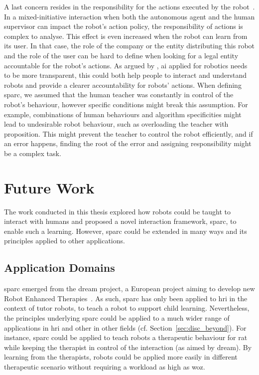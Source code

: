 A last concern resides in the responsibility for the actions executed by the robot~\citep{asaro2007robots}. In a mixed-initiative interaction when both the autonomous agent and the human supervisor can impact the robot's action policy, the responsibility of actions is complex to analyse. This effect is even increased when the robot can learn from its user. In that case, the role of the company or the entity distributing this robot and the role of the user can be hard to define when looking for a legal entity accountable for the robot's actions. As argued by \cite{wachter2017transparent}, \gls{ai} applied for robotics needs to be more transparent, this could both help people to interact and understand robots and provide a clearer accountability for robots' actions. When defining \gls{sparc}, we assumed that the human teacher was constantly in control of the robot's behaviour, however specific conditions might break this assumption. For example, combinations of human behaviours and algorithm specificities might lead to undesirable robot behaviour, such as overloading the teacher with proposition. This might prevent the teacher to control the robot efficiently, and if an error happens, finding the root of the error and assigning responsibility might be a complex task.

\section{Future Work}


The work conducted in this thesis explored how robots could be taught to interact with humans and proposed a novel interaction framework, \gls{sparc}, to enable such a learning. However, \gls{sparc} could be extended in many ways and its principles applied to other applications.

\subsection{Application Domains}

\gls{sparc} emerged from the \acrshort{dream} project, a European project aiming to develop new Robot Enhanced Therapies~\citep{thill2012robot,esteban2017build}. As such, \gls{sparc} has only been applied to \gls{hri} in the context of tutor robots, to teach a robot to support child learning. Nevertheless, the principles underlying \gls{sparc} could be applied to a much wider range of applications in \gls{hri} and other in other fields (cf. Section~\ref{sec:disc_beyond}). For instance, \gls{sparc} could be applied to teach robots a therapeutic behaviour for \gls{rat} while keeping the therapist in control of the interaction (as aimed by \acrshort{dream}). By learning from the therapists, robots could be applied more easily in different therapeutic scenario without requiring a workload as high as \gls{woz}. 

